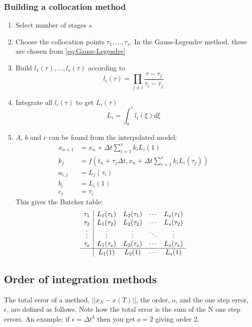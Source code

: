 \subsubsection{Building a collocation method}
\begin{enumerate}
    \item Select number of stages $s$
    \item Choose the collocation points $\tau_1,\dots,\tau_s$. In the Gauss-Legendre method, these are chosen from \autoref{eq:Gauss-Legendre}
    \item Build $l_1(\tau),\dots,l_s(\tau)$ according to 
    $$ \label{eq:l_i_formula}
    l_i(\tau)= \prod_{j\ne i} \frac{\tau-\tau_j}{\tau_i-\tau_j}
    $$
    \item Integrate all $l_i(\tau)$ to get $L_i(\tau)$
    $$
    L_i=\int_0^\tau l_i(\xi)d\xi
    $$
    \item $A$, $b$ and $c$ can be found from the interpolated model:
    $$
    \begin{aligned}
        x_{n+1} &= x_n + \Delta t\sum_{i=1}^s k_iL_i(1)\\
        k_j &= f(t_n + \tau_j\Delta t, x_n + \Delta t \sum_{i=1}^s k_iL_i(\tau_j))\\
        a_{i,j} &= L_j(\tau_i)\\
        b_i &= L_i(1)\\
        c_i &= \tau_i
    \end{aligned}
    $$
    This gives the Butcher table:
    $$
    \begin{array}{c|cccc}
        \tau_1 & L_1(\tau_1) & L_2(\tau_1) & \cdots & L_s(\tau_1) \\
        \tau_2 & L_1(\tau_2) & L_2(\tau_2) & \cdots & L_s(\tau_2) \\
        \vdots & \vdots      & \vdots      & \ddots & \vdots \\
        \tau_s & L_1(\tau_s) & L_2(\tau_s) & \cdots & L_s(\tau_s) \\
        \hline
               & L_1(1)      & L_2(1)      & \cdots & L_s(1)
    \end{array}
    $$
\end{enumerate}

\subsection{Order of integration methods}

The total error of a method, $||x_N - x(T)||$, the order, o, and the one step error, $\epsilon$, are defined as follows. Note how the total error is the sum of the N one step errors. An example: if $\epsilon=\Delta t^3$ then you get $o=2$ giving order 2.

